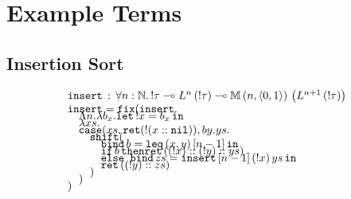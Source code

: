 \section{Example Terms}

\subsection{Insertion Sort}
$$
\begin{array}{l}
\texttt{insert} \, : \, \forall n : \mathbb{N}. \, !\tau \multimap L^n\left(!\tau\right) \multimap \mathbb{M} \, (n,\langle 0,1\rangle) \, \left(L^{n+1}\left(!\tau\right)\right)\\
\texttt{insert} = \texttt{fix}(\texttt{insert}.\\[-2mm]
\hspace{1em} \Lambda n. \lambda b_x. \texttt{let} \, !x = b_x \, \texttt{in}\\[-2mm]
\hspace{1em} \lambda xs.\\[-2mm]
\hspace{1em} \texttt{case}(xs,\texttt{ret}(!(x::\texttt{nil})),by.ys.\\[-2mm]
\hspace{2em} \texttt{shift}(\\[-2mm]
\hspace{3em} \texttt{bind} \, b = \texttt{leq} \, (x,y) \, [n-1] \, \texttt{in}\\[-2mm]
\hspace{3em} \texttt{if} \, b \, \texttt{then} \texttt{ret} \, ((!x)::(!y)::ys)\\[-2mm]
\hspace{3em} \texttt{else bind} \, zs = \texttt{insert} \, [n-1] \, (!x) \, ys \, \texttt{in}\\[-2mm]
\hspace{3em} \texttt{ret} \, ((!y)::zs)\\[-2mm]
\hspace{2em})\\[-2mm]
\hspace{1em})\\[-2mm]
)
\end{array}
$$

